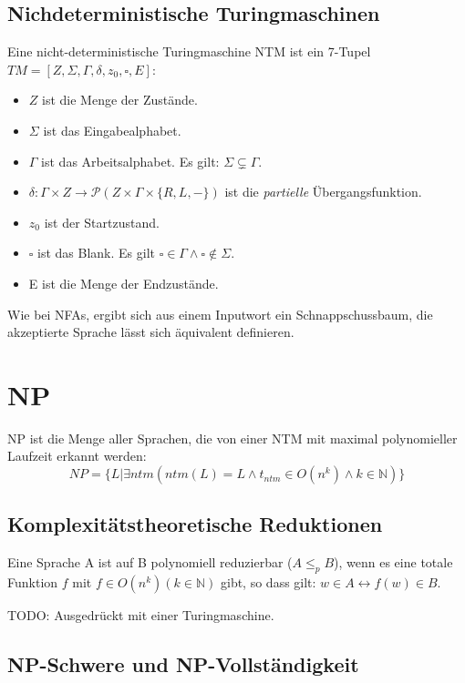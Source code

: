 \subsection{Nichdeterministische Turingmaschinen}

Eine nicht-deterministische Turingmaschine NTM ist ein 7-Tupel 
$TM = [Z, \Sigma, \Gamma, \delta, z_0, \square, E]$:
\begin{itemize}
    \item $Z$ ist die Menge der Zustände.
    \item $\Sigma$ ist das Eingabealphabet.
    \item $\Gamma$ ist das Arbeitsalphabet. Es gilt: $\Sigma \subsetneq \Gamma$.
    \item $\delta: \Gamma \times Z \rightarrow \mathcal{P}(Z \times \Gamma \times \{R,L,-\})$
        ist die \emph{partielle} Übergangsfunktion.
    \item $z_0$ ist der Startzustand.
    \item $\square$ ist das Blank.
        Es gilt $\square \in \Gamma \wedge \square \notin \Sigma$.
    \item E ist die Menge der Endzustände.
\end{itemize}

Wie bei NFAs, ergibt sich aus einem Inputwort ein Schnappschussbaum,
die akzeptierte Sprache lässt sich äquivalent definieren.

\section{NP}
NP ist die Menge aller Sprachen,
die von einer NTM mit maximal polynomieller Laufzeit erkannt werden:
\[
    NP = \{L| \exists ntm (ntm(L) = L \wedge t_{ntm} \in O(n^k) \wedge k \in \mathbb{N})\}
\]
\subsection{Komplexitätstheoretische Reduktionen}

Eine Sprache A ist auf B polynomiell reduzierbar ($A \leq_p B$), 
wenn es eine totale Funktion $f$ mit $f \in O(n^k) (k \in \mathbb{N})$ gibt,
so dass gilt: $w \in A \leftrightarrow f(w) \in B$.

TODO: Ausgedrückt mit einer Turingmaschine.

\subsection{NP-Schwere und NP-Vollständigkeit}


